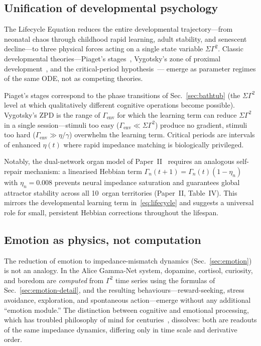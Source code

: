 ﻿\documentclass[aps,pre,twocolumn,superscriptaddress,floatfix]{revtex4-2}
\begin{document}
\subsection{Unification of developmental psychology}

The Lifecycle Equation reduces the entire
developmental trajectory---from neonatal chaos
through childhood rapid learning, adult stability,
and senescent decline---to three physical forces
acting on a single state variable $\Sigma\Gamma^2$.
Classic developmental theories---Piaget's stages~\cite{Piaget1952},
Vygotsky's zone of proximal development~\cite{Vygotsky1978},
and the critical-period hypothesis~\cite{Hensch2005}---
emerge as parameter regimes of the same ODE,
not as competing theories.

Piaget's stages correspond to the phase transitions
of Sec.~\ref{sec:bathtub} (the
$\Sigma\Gamma^2$ level at which qualitatively
different cognitive operations become possible).
Vygotsky's ZPD is the range of $\Gamma_{\mathrm{env}}$
for which the learning term can reduce $\Sigma\Gamma^2$
in a single session---stimuli too easy
($\Gamma_{\mathrm{env}} \ll \Sigma\Gamma^2$) produce
no gradient, stimuli too hard
($\Gamma_{\mathrm{env}} \gg \eta/\gamma$) overwhelm
the learning term.
Critical periods are intervals of enhanced $\eta(t)$
where rapid impedance matching is biologically
privileged.

Notably, the dual-network organ model of Paper~II~\cite{PaperII}
requires an analogous self-repair mechanism:
a linearised Hebbian term
$\Gamma_n(t+1) = \Gamma_n(t)(1-\eta_n)$ with $\eta_n = 0.008$
prevents neural impedance saturation and guarantees
global attractor stability across all 10~organ territories
(Paper~II, Table~IV).
This mirrors the developmental learning term in~\eqref{eq:lifecycle}
and suggests a universal role for small, persistent
Hebbian corrections throughout the lifespan.

\subsection{Emotion as physics, not computation}

The reduction of emotion to impedance-mismatch dynamics
(Sec.~\ref{sec:emotion}) is not an analogy.
In the Alice Gamma-Net system, dopamine, cortisol,
curiosity, and boredom are \emph{computed} from
$\Gamma^2$ time series using the formulas
of Sec.~\ref{sec:emotion-detail}, and the resulting
behaviours---reward-seeking, stress avoidance,
exploration, and spontaneous action---emerge
without any additional ``emotion module.''
The distinction between cognitive and emotional
processing, which has troubled philosophy of mind
for centuries~\cite{Damasio1994}, dissolves:
both are readouts of the same impedance dynamics,
differing only in time scale and derivative order.
\end{document}
